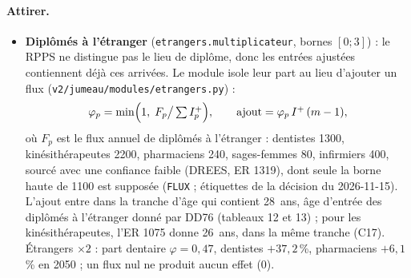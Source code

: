 \paragraph{Attirer.}
\begin{itemize}
  \item \textbf{Diplômés à l'étranger} (\texttt{etrangers.multiplicateur}, bornes $[0 ; 3]$) : le RPPS ne
        distingue pas le lieu de diplôme, donc les entrées ajustées contiennent déjà ces arrivées. Le module
        isole leur part au lieu d'ajouter un flux (\texttt{v2/jumeau/modules/etrangers.py}) :
        \begin{equation}\label{jum:eq:etrangers}
          \varphi_p = \min\Bigl(1,\; F_p \big/ \textstyle\sum I^{+}_p\Bigr), \qquad
          \text{ajout} = \varphi_p\, I^{+}\, (m - 1),
        \end{equation}
        où $F_p$ est le flux annuel de diplômés à l'étranger : dentistes \num{1300}\derive{}, kinésithérapeutes
        \num{2200}\derive{}, pharmaciens 240\derive{}, sages-femmes 80\derive{}, infirmiers 400, sourcé
        avec une confiance faible (DREES, ER 1319), dont seule la borne haute de \num{1100}\suppose{} est supposée
        (\texttt{FLUX} ; étiquettes de la décision du 2026-11-15). L'ajout entre dans la tranche d'âge qui contient
        28~ans, âge d'entrée des diplômés à l'étranger donné par DD76 (tableaux 12 et 13) ; pour les
        kinésithérapeutes, l'ER 1075 donne 26~ans, dans la même tranche (C17). Étrangers $\times 2$ : part dentaire $\varphi = 0{,}47$\mesure{}, dentistes
        $+37{,}2$\mesure{}\,\%, pharmaciens $+6{,}1$\mesure{}\,\% en 2050 ; un flux nul ne produit aucun effet
        (0\mesure{}).
\end{itemize}

